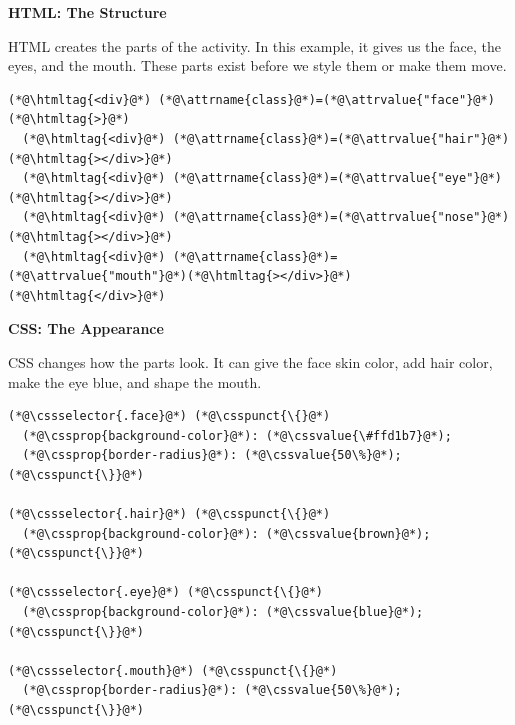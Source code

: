 \documentclass{article}
\begin{document}
\noindent
\begin{minipage}[t]{0.31\textwidth}
  \textbf{\Bitter\textcolor{naranja}{HTML: The Structure}}

  \vspace{0.15cm}

  HTML creates the parts of the activity. In this example, it gives us the face, the eyes, and the mouth. These parts exist before we style them or make them move.

  \vspace{0.2cm}

  \begin{lstlisting}
(*@\htmltag{<div}@*) (*@\attrname{class}@*)=(*@\attrvalue{"face"}@*)(*@\htmltag{>}@*)
  (*@\htmltag{<div}@*) (*@\attrname{class}@*)=(*@\attrvalue{"hair"}@*)(*@\htmltag{></div>}@*)
  (*@\htmltag{<div}@*) (*@\attrname{class}@*)=(*@\attrvalue{"eye"}@*)(*@\htmltag{></div>}@*)
  (*@\htmltag{<div}@*) (*@\attrname{class}@*)=(*@\attrvalue{"nose"}@*)(*@\htmltag{></div>}@*)
  (*@\htmltag{<div}@*) (*@\attrname{class}@*)=(*@\attrvalue{"mouth"}@*)(*@\htmltag{></div>}@*)
(*@\htmltag{</div>}@*)
\end{lstlisting}

\end{minipage}
\hfill
\begin{minipage}[t]{0.31\textwidth}
  \textbf{\Bitter\textcolor{naranja}{CSS: The Appearance}}

  \vspace{0.15cm}

  CSS changes how the parts look. It can give the face skin color, add hair color, make the eye blue, and shape the mouth.

  \vspace{0.2cm}

  \begin{lstlisting}
(*@\cssselector{.face}@*) (*@\csspunct{\{}@*)
  (*@\cssprop{background-color}@*): (*@\cssvalue{\#ffd1b7}@*);
  (*@\cssprop{border-radius}@*): (*@\cssvalue{50\%}@*);
(*@\csspunct{\}}@*)

(*@\cssselector{.hair}@*) (*@\csspunct{\{}@*)
  (*@\cssprop{background-color}@*): (*@\cssvalue{brown}@*);
(*@\csspunct{\}}@*)

(*@\cssselector{.eye}@*) (*@\csspunct{\{}@*)
  (*@\cssprop{background-color}@*): (*@\cssvalue{blue}@*);
(*@\csspunct{\}}@*)

(*@\cssselector{.mouth}@*) (*@\csspunct{\{}@*)
  (*@\cssprop{border-radius}@*): (*@\cssvalue{50\%}@*);
(*@\csspunct{\}}@*)
\end{lstlisting}

\end{minipage}
\end{document}
